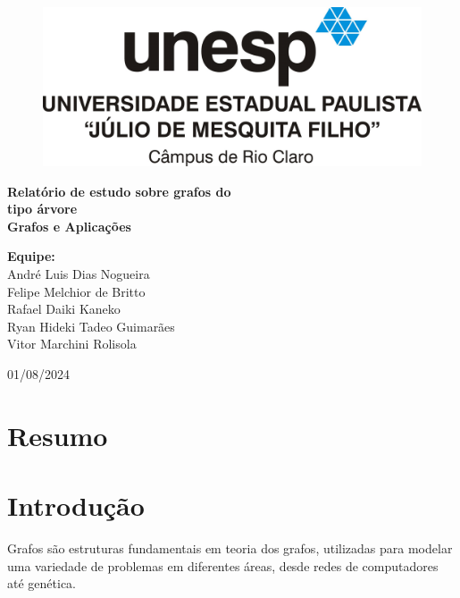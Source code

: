 \documentclass[12pt, a4paper]{scrreprt}
\begin{document}
\begin{titlepage}
    \centering
    \begin{figure}[h]
        \centering
        \includegraphics[width=.75\textwidth]{src/logo_unesp.jpg}
        \label{fig:logo_unesp}
    \end{figure}
    \vfill
    \Huge\textbf{Relatório de estudo sobre grafos do \\ tipo árvore}\\[1.5cm]
    \Large\textbf{Grafos e Aplicações}\\[1.5cm]
    \vfill
    \begin{flushleft}
        \textbf{Equipe:}\\
        \hspace{1.5cm}André Luis Dias Nogueira \\ 
        \hspace{1.5cm}Felipe Melchior de Britto \\
        \hspace{1.5cm}Rafael Daiki Kaneko \\
        \hspace{1.5cm}Ryan Hideki Tadeo Guimarães \\
        \hspace{1.5cm}Vitor Marchini Rolisola \\
    \end{flushleft}
    \vfill
    01/08/2024\\
\end{titlepage}

\tableofcontents
\newpage

\chapter{Resumo}

\chapter{Introdução}

Grafos são estruturas fundamentais em teoria dos grafos, utilizadas para modelar uma variedade de problemas em diferentes áreas, desde redes de computadores até genética.
\end{document}
